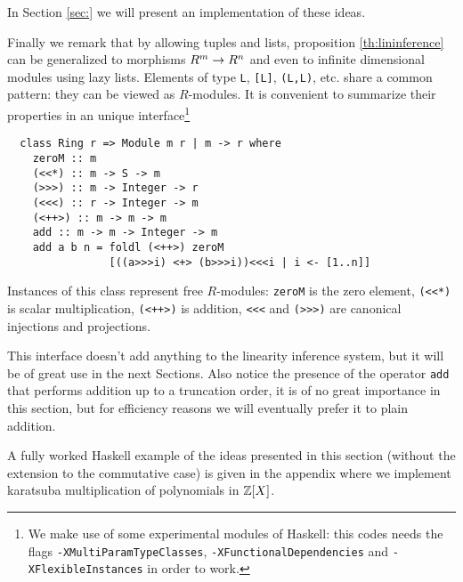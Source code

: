 In Section \ref{sec:} we will present an implementation of these
ideas.

Finally we remark that by allowing tuples and lists, proposition
\ref{th:lininference} can be generalized to morphisms $R^m\rightarrow R^n$ and
even to infinite dimensional modules using lazy lists. Elements of
type \lstinline{L}, \lstinline{[L]}, \lstinline{(L,L)}, etc. share a
common pattern: they can be viewed as $R$-modules. It is convenient to
summarize their properties in an unique interface\footnote{We make use
  of some experimental modules of Haskell: this codes needs the flags
  \lstinline{-XMultiParamTypeClasses},
  \lstinline{-XFunctionalDependencies} and
  \lstinline{-XFlexibleInstances} in order to work.}
\begin{lstlisting}
  class Ring r => Module m r | m -> r where
    zeroM :: m
    (<<*) :: m -> S -> m
    (>>>) :: m -> Integer -> r
    (<<<) :: r -> Integer -> m
    (<++>) :: m -> m -> m
    add :: m -> m -> Integer -> m
    add a b n = foldl (<++>) zeroM
                [((a>>>i) <+> (b>>>i))<<<i | i <- [1..n]]
\end{lstlisting}

Instances of this class represent free $R$-modules: \lstinline{zeroM}
is the zero element, \lstinline{(<<*)} is scalar multiplication,
\lstinline{(<++>)} is addition, \lstinline{<<<} and \lstinline{(>>>)}
are canonical injections and projections. 

This interface doesn't add anything to the linearity inference system,
but it will be of great use in the next Sections.  Also notice the
presence of the operator \lstinline{add} that performs addition up to
a truncation order, it is of no great importance in this section, but
for efficiency reasons we will eventually prefer it to plain addition.

A fully worked Haskell example of the ideas presented in this section
(without the extension to the commutative case) is given in the
appendix where we implement karatsuba multiplication of polynomials in
$\mathbb{Z}[X]$.


%
